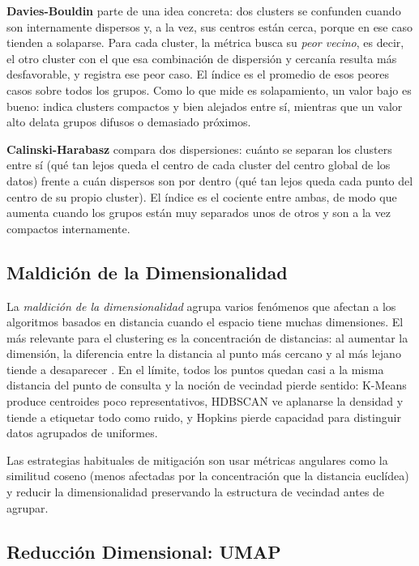 \textbf{Davies-Bouldin} parte de una idea concreta: dos clusters se confunden cuando son internamente dispersos y, a la vez, sus centros están cerca, porque en ese caso tienden a solaparse. Para cada cluster, la métrica busca su \textit{peor vecino}, es decir, el otro cluster con el que esa combinación de dispersión y cercanía resulta más desfavorable, y registra ese peor caso. El índice es el promedio de esos peores casos sobre todos los grupos. Como lo que mide es solapamiento, un valor bajo es bueno: indica clusters compactos y bien alejados entre sí, mientras que un valor alto delata grupos difusos o demasiado próximos.

\textbf{Calinski-Harabasz} compara dos dispersiones: cuánto se separan los clusters entre sí (qué tan lejos queda el centro de cada cluster del centro global de los datos) frente a cuán dispersos son por dentro (qué tan lejos queda cada punto del centro de su propio cluster). El índice es el cociente entre ambas, de modo que aumenta cuando los grupos están muy separados unos de otros y son a la vez compactos internamente.

\subsection{Maldición de la Dimensionalidad}
\label{subsec:curse-dimensionality}

La \textit{maldición de la dimensionalidad} agrupa varios fenómenos que afectan a los algoritmos basados en distancia cuando el espacio tiene muchas dimensiones. El más relevante para el clustering es la concentración de distancias: al aumentar la dimensión, la diferencia entre la distancia al punto más cercano y al más lejano tiende a desaparecer \parencite{aggarwal_2001_dimensionality}. En el límite, todos los puntos quedan casi a la misma distancia del punto de consulta y la noción de vecindad pierde sentido: K-Means produce centroides poco representativos, HDBSCAN ve aplanarse la densidad y tiende a etiquetar todo como ruido, y Hopkins pierde capacidad para distinguir datos agrupados de uniformes.

Las estrategias habituales de mitigación son usar métricas angulares como la similitud coseno (menos afectadas por la concentración que la distancia euclídea) y reducir la dimensionalidad preservando la estructura de vecindad antes de agrupar.

\subsection{Reducción Dimensional: UMAP}
\label{subsec:umap}

